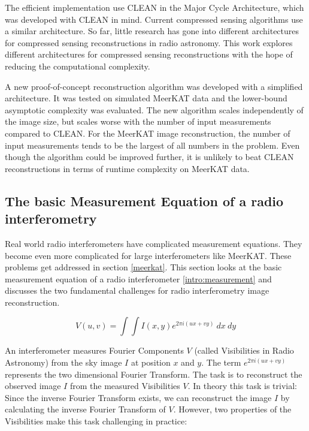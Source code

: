 The efficient implementation use CLEAN in the Major Cycle Architecture, which was developed with CLEAN in mind. Current compressed sensing algorithms use a similar architecture. So far, little research has gone into different architectures for compressed sensing reconstructions in radio astronomy. This work explores different architectures for compressed sensing reconstructions with the hope of reducing the computational complexity. 

A new proof-of-concept reconstruction algorithm was developed with a simplified architecture. It was tested on simulated MeerKAT data and the lower-bound asymptotic complexity was evaluated. The new algorithm scales independently of the image size, but scales worse with the number of input measurements compared to CLEAN. For the MeerKAT image reconstruction, the number of input measurements tends to be the largest of all numbers in the problem. Even though the algorithm could be improved further, it is unlikely to beat CLEAN reconstructions in terms of runtime complexity on MeerKAT data.


\subsection{The basic Measurement Equation of a radio interferometry}\label{intro:basic}
Real world radio interferometers have complicated measurement equations. They become even more complicated for large interferometers like MeerKAT. These problems get addressed in section \ref{meerkat}. This section looks at the basic measurement equation of a radio interferometer \eqref{intro:measurement} and discusses the two fundamental challenges for radio interferometry image reconstruction. 

\begin{equation}\label{intro:measurement}
V(u, v) = \int\int I(x, y) e^{2 \pi i (ux+vy)} \: dx \: dy
\end{equation}

An interferometer measures Fourier Components $V$ (called Visibilities in Radio Astronomy) from the sky image $I$ at position $x$ and $y$. The term $e^{2 \pi i (ux+vy)}$ represents the two dimensional Fourier Transform. The task is to reconstruct the observed image $I$ from the measured Visibilities $V$. In theory this task is trivial: Since the inverse Fourier Transform exists, we can reconstruct the image $I$ by calculating the inverse Fourier Transform of $V$. However, two properties of the Visibilities make this task challenging in practice:

